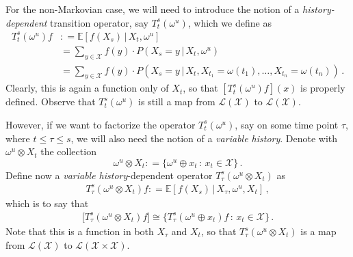 \documentclass[a4paper,reqno]{amsart}
\newcommand{\states}{\mathcal{X}}
\newcommand{\gambles}{\mathcal{L}}
\newcommand{\gamblesX}{\gambles(\states)}
\newcommand{\coloneqq}{:\!=}
\begin{document}
For the non-Markovian case, we will need to introduce the notion of a \emph{history-dependent} transition operator, say $T_t^s(\omega^u)$, which we define as
\begin{align*}
T_t^s(\omega^u) f &\coloneqq \mathbb{E}[f(X_s)\,\vert\,X_t,\omega^u] \\
 &= \sum_{y\in\states} f(y)\cdot P(X_s=y\,\vert\,X_t, \omega^u) \\
 &= \sum_{y\in\states} f(y)\cdot P(X_s=y\,\vert\,X_t, X_{t_1}=\omega(t_1),\ldots,X_{t_n}=\omega(t_n))\,.
\end{align*}
Clearly, this is again a function only of $X_t$, so that $[T_t^s(\omega^u) f](x)$ is properly defined. Observe that $T_t^s(\omega^u)$ is still a map from $\gamblesX$ to $\gamblesX$.

However, if we want to factorize the operator $T_t^s(\omega^u)$, say on some time point $\tau$, where $t\leq \tau\leq s$, we will also need the notion of a \emph{variable history}. Denote with $\omega^u\otimes X_t$ the collection
\begin{equation*}
\omega^u\otimes X_t \coloneqq \{\omega^u\oplus x_t\,:\,x_t\in\states\}\,.
\end{equation*}
Define now a \emph{variable history}-dependent operator $T_\tau^s(\omega^u\otimes X_t)$ as
\begin{align*}
T_\tau^s(\omega^u\otimes X_t)f \coloneqq \mathbb{E}[f(X_s)\,\vert\,X_\tau,\omega^u,X_t]\,,
\end{align*}
which is to say that
\begin{align*}
\bigl[T_\tau^s(\omega^u\otimes X_t)f\bigr] \cong \bigl\{T_\tau^s(\omega^u\oplus x_t)f \,:\, x_t\in\states\bigr\}\,.
\end{align*}
Note that this is a function in both $X_\tau$ and $X_t$, so that $T_\tau^s(\omega^u\otimes X_t)$ is a map from $\gamblesX$ to $\gambles(\states\times\states)$. 
\end{document}
